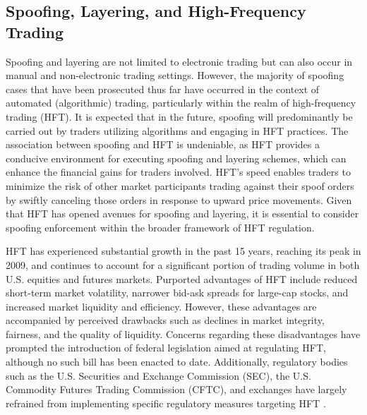 \subsection{Spoofing, Layering, and High-Frequency Trading}

Spoofing and layering are not limited to electronic trading but can also occur in manual and non-electronic trading settings.
However, the majority of spoofing cases that have been prosecuted thus far have occurred in the context of automated (algorithmic)
trading, particularly within the realm of high-frequency trading (HFT). It is expected that in the future, spoofing will
predominantly be carried out by traders utilizing algorithms and engaging in HFT practices. The association between spoofing
and HFT is undeniable, as HFT provides a conducive environment for executing spoofing and layering schemes, which can enhance
the financial gains for traders involved. HFT's speed enables traders to minimize the risk of other market participants
trading against their spoof orders by swiftly canceling those orders in response to upward price movements. Given that HFT
has opened avenues for spoofing and layering, it is essential to consider spoofing enforcement within the broader framework
of HFT regulation.

HFT has experienced substantial growth in the past 15 years, reaching its peak in 2009, and continues to account for a
significant portion of trading volume in both U.S. equities and futures markets. Purported advantages of HFT include reduced
short-term market volatility, narrower bid-ask spreads for large-cap stocks, and increased market liquidity and efficiency.
However, these advantages are accompanied by perceived drawbacks such as declines in market integrity, fairness, and the
quality of liquidity. Concerns regarding these disadvantages have prompted the introduction of federal legislation aimed
at regulating HFT, although no such bill has been enacted to date. Additionally, regulatory bodies such as the U.S.
Securities and Exchange Commission (SEC), the U.S. Commodity Futures Trading Commission (CFTC), and exchanges have largely
refrained from implementing specific regulatory measures targeting HFT \cite{chilton2012perspectives}.

